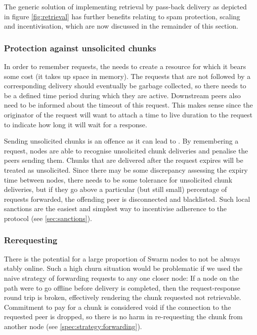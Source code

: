 The generic solution of implementing retrieval by pass-back delivery as depicted in figure \ref{fig:retrieval} has further benefits relating to spam protection, scaling and incentivisation, which are now discussed in the remainder of this section.

\subsubsection{Protection against unsolicited chunks}

In order to remember requests, the  needs to create a resource for which it bears some cost (it takes up space in memory). The requests that are not followed by a corresponding delivery should eventually be garbage collected, so there needs to be a defined time period during which they are active. Downstream peers also need to be informed about the timeout of this request. This makes sense since the originator of the request will want to attach a time to live duration to the request to indicate how long it will wait for a response.  

Sending unsolicited chunks is an offence as it can lead to . By remembering a request, nodes are able to recognise unsolicited chunk deliveries and penalise the peers sending them. Chunks that are delivered after the request expires will be treated as unsolicited. Since there may be some discrepancy assessing the expiry time between nodes, there needs to be some tolerance for unsolicited chunk deliveries, but if they go above a particular (but still small) percentage of requests forwarded, the offending peer is disconnected and blacklisted. Such local sanctions are the easiest and simplest way to incentivise adherence to the protocol (see \ref{sec:sanctions}). 

\subsubsection{Rerequesting}

There is the potential for a large proportion of Swarm nodes to not be always stably online. Such a high churn situation would be problematic if we used the naive strategy of forwarding requests to any one closer node: If a node on the path were to go offline before delivery is completed, then the request-response round trip is broken, effectively rendering the chunk requested not retrievable. Commitment to pay for a chunk is considered void if the connection to the requested peer is dropped, so there is no harm in re-requesting the chunk from another node (see \ref{spec:strategy:forwarding}).


